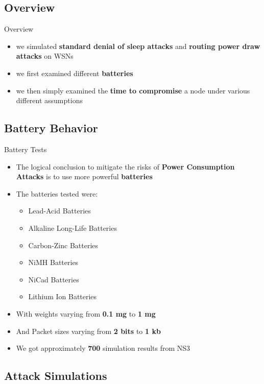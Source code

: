 \documentclass{beamer}
\begin{document}
\subsection{Overview}
\begin{frame}{Overview}
\begin{itemize}
	\item we simulated \textbf{standard denial of sleep attacks} and \textbf{routing power draw attacks} on WSNs
	\item we first examined different \textbf{batteries}
	\item we then simply examined the \textbf{time to compromise} a node under various different assumptions
\end{itemize}
\end{frame}
\subsection{Battery Behavior}

\begin{frame}{Battery Tests}
\begin{itemize}
	\item The logical conclusion to mitigate the risks of \textbf{Power Consumption Attacks} is to use more powerful \textbf{batteries}
	\item The batteries tested were: 
	\begin{itemize}
	  \item Lead-Acid Batteries
	  \item Alkaline Long-Life Batteries
	  \item Carbon-Zinc Batteries
	  \item NiMH Batteries
	  \item NiCad Batteries
	  \item Lithium Ion Batteries
	\end{itemize}
	\item With weights varying from \textbf{0.1 mg} to \textbf{1 mg}
	\item And Packet sizes varying from \textbf{2 bits} to \textbf{1 kb}
	\item We got approximately \textbf{700} simulation results from NS3
\end{itemize}
\end{frame}

\subsection{Attack Simulations}
\end{document}
